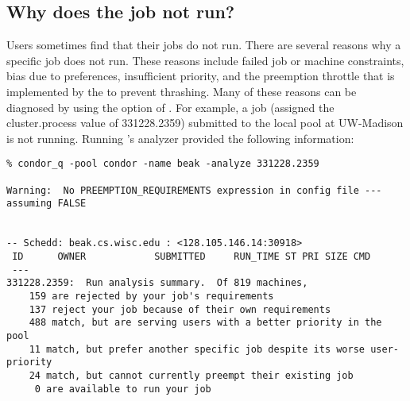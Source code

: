 \subsection{Why does the job not run?}
Users sometimes find that their jobs do not run.  There are several reasons why
a specific job does not run.  These reasons include failed job or machine
constraints, bias due to preferences, insufficient priority, and the preemption
throttle that is implemented by the  to prevent
thrashing.  Many of these reasons can be diagnosed by using the 
option of .
For example, a job (assigned the cluster.process value of
331228.2359) submitted to the local pool at UW-Madison
is not running.
Running 's analyzer provided the following information:
\footnotesize
\begin{verbatim}
% condor_q -pool condor -name beak -analyze 331228.2359

Warning:  No PREEMPTION_REQUIREMENTS expression in config file --- assuming FALSE


-- Schedd: beak.cs.wisc.edu : <128.105.146.14:30918>
 ID      OWNER            SUBMITTED     RUN_TIME ST PRI SIZE CMD
 ---
331228.2359:  Run analysis summary.  Of 819 machines,
    159 are rejected by your job's requirements
    137 reject your job because of their own requirements
    488 match, but are serving users with a better priority in the pool
    11 match, but prefer another specific job despite its worse user-priority
    24 match, but cannot currently preempt their existing job
     0 are available to run your job
\end{verbatim}
\normalsize

